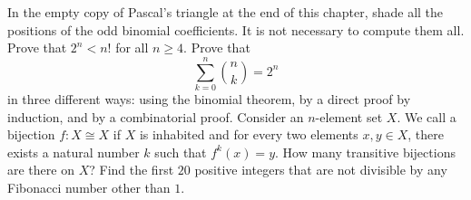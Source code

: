 \exercises

\begin{starter}
  \exercise In the empty copy of Pascal's triangle at the end of this chapter, shade all the positions of the odd binomial coefficients. It is not necessary to compute them all.
  \exercise Prove that $2^n<n!$ for all $n\geq 4$.
  \exercise Prove that
  \begin{equation*}
    \sum_{k=0}^n \binom{n}{k} = 2^n
  \end{equation*}
  in three different ways: using the binomial theorem, by a direct proof by induction, and by a combinatorial proof.
  \exercise Consider an $n$-element set $X$. We call a bijection $f:X\cong X$  if $X$ is inhabited and for every two elements $x,y\in X$, there exists a natural number $k$ such that $f^k(x)=y$. How many transitive bijections are there on $X$?
  \exercise Find the first $20$ positive integers that are not divisible by any Fibonacci number other than $1$. %
\end{starter}

